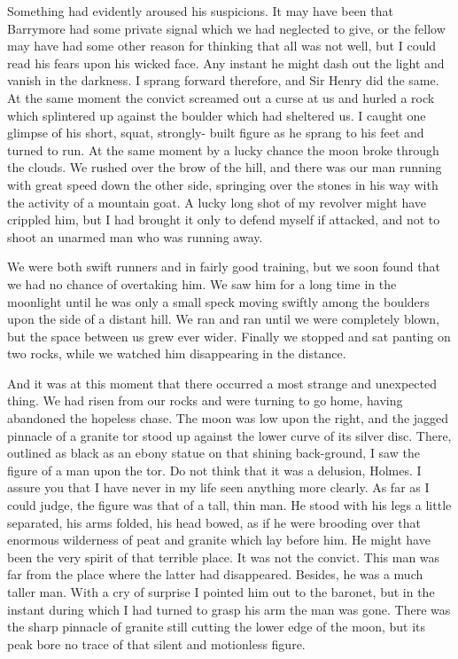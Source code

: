 Something had evidently aroused his suspicions. It may have been that Barrymore had some private signal which we had neglected to give, or the fellow may have had some other reason for thinking that all was not well, but I could read his fears upon his wicked face. Any instant he might dash out the light and vanish in the darkness. I sprang forward therefore, and Sir Henry did the same. At the same moment the convict screamed out a curse at us and hurled a rock which splintered up against the boulder which had sheltered us. I caught one glimpse of his short, squat, strongly- built figure as he sprang to his feet and turned to run. At the same moment by a lucky chance the moon broke through the clouds. We rushed over the brow of the hill, and there was our man running with great speed down the other side, springing over the stones in his way with the activity of a mountain goat. A lucky long shot of my revolver might have crippled him, but I had brought it only to defend myself if attacked, and not to shoot an unarmed man who was running away.

We were both swift runners and in fairly good training, but we soon found that we had no chance of overtaking him. We saw him for a long time in the moonlight until he was only a small speck moving swiftly among the boulders upon the side of a distant hill. We ran and ran until we were completely blown, but the space between us grew ever wider. Finally we stopped and sat panting on two rocks, while we watched him disappearing in the distance.



And it was at this moment that there occurred a most strange and unexpected thing. We had risen from our rocks and were turning to go home, having abandoned the hopeless chase. The moon was low upon the right, and the jagged pinnacle of a granite tor stood up against the lower curve of its silver disc. There, outlined as black as an ebony statue on that shining back-ground, I saw the figure of a man upon the tor. Do not think that it was a delusion, Holmes. I assure you that I have never in my life seen anything more clearly. As far as I could judge, the figure was that of a tall, thin man. He stood with his legs a little separated, his arms folded, his head bowed, as if he were brooding over that enormous wilderness of peat and granite which lay before him. He might have been the very spirit of that terrible place. It was not the convict. This man was far from the place where the latter had disappeared. Besides, he was a much taller man. With a cry of surprise I pointed him out to the baronet, but in the instant during which I had turned to grasp his arm the man was gone. There was the sharp pinnacle of granite still cutting the lower edge of the moon, but its peak bore no trace of that silent and motionless figure.

